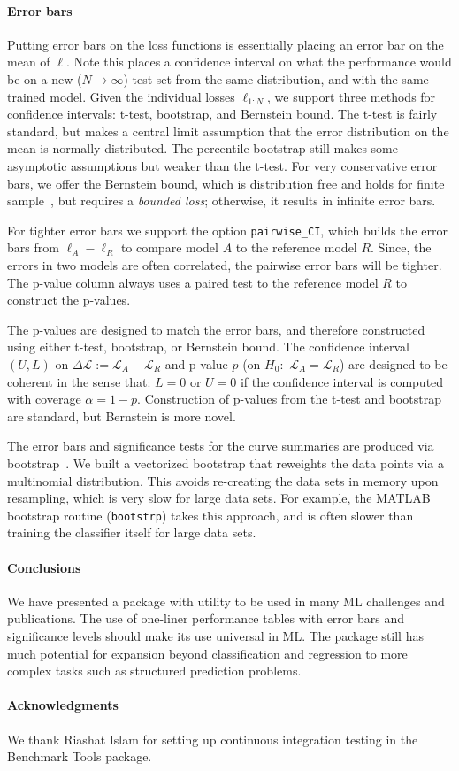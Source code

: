 \documentclass{article}
\newcommand{\Loss}{\mathcal{L}}
\newcommand{\loss}{\ell}
\newcommand{\code}{\texttt}
\newcommand{\sectionx}{\paragraph}
\begin{document}
\sectionx{Error bars}
Putting error bars on the loss functions is essentially placing an error bar on the mean of $\loss$.
Note this places a confidence interval on what the performance would be on a new ($N \rightarrow \infty$) test set from the same distribution, and with the same trained model.
Given the individual losses $\loss_{1:N}$, we support three methods for confidence intervals: t-test, bootstrap, and Bernstein bound.
The t-test is fairly standard, but makes a central limit assumption that the error distribution on the mean is normally distributed.
The percentile bootstrap still makes some asymptotic assumptions but weaker than the t-test.
For very conservative error bars, we offer the Bernstein bound, which is distribution free and holds for finite sample~\citep{Audibert2009}, but requires a \emph{bounded loss}; otherwise, it results in infinite error bars.

For tighter error bars we support the option \code{pairwise\_CI}, which builds the error bars from $\loss_A - \loss_R$ to compare model $A$ to the reference model $R$.
Since, the errors in two models are often correlated, the pairwise error bars will be tighter.
The p-value column always uses a paired test to the reference model $R$ to construct the p-values.

The p-values are designed to match the error bars, and therefore constructed using either t-test, bootstrap, or Bernstein bound.
The confidence interval $(U,L)$ on $\Delta \Loss := \Loss_A - \Loss_R$ and p-value $p$ (on $H_0$:~$\Loss_A = \Loss_R$) are designed to be coherent in the sense that: $L = 0$ or $U = 0$ if the confidence interval is computed with coverage $\alpha=1-p$.
Construction of p-values from the t-test and bootstrap are standard, but Bernstein is more novel.

The error bars and significance tests for the curve summaries are produced via bootstrap~\citep{Efron1994}.
We built a vectorized bootstrap that reweights the data points via a multinomial distribution.
This avoids re-creating the data sets in memory upon resampling, which is very slow for large data sets.
For example, the MATLAB bootstrap routine (\code{bootstrp}) takes this approach, and is often slower than training the classifier itself for large data sets.

\sectionx{Conclusions}
We have presented a package with utility to be used in many ML challenges and publications.
The use of one-liner performance tables with error bars and significance levels should make its use universal in ML\@.
The package still has much potential for expansion beyond classification and regression to more complex tasks such as structured prediction problems.

\paragraph{Acknowledgments}
We thank Riashat Islam for setting up continuous integration testing in the Benchmark Tools package.


\end{document}

